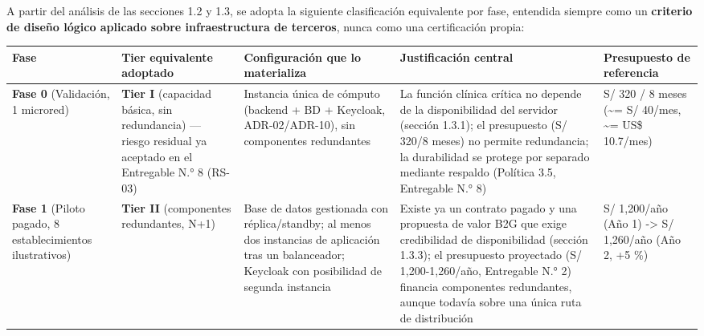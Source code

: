 \documentclass[11pt,a4paper]{article}
\begin{document}
A partir del análisis de las secciones 1.2 y 1.3, se adopta la siguiente clasificación equivalente por fase, entendida siempre como un \textbf{criterio de diseño lógico aplicado sobre infraestructura de terceros}, nunca como una certificación propia:

{\small
\begin{longtable}[]{@{}
  >{\raggedright\arraybackslash}p{}
  >{\raggedright\arraybackslash}p{}
  >{\raggedright\arraybackslash}p{}
  >{\raggedright\arraybackslash}p{}
  >{\raggedright\arraybackslash}p{}@{}}
\toprule\noalign{}
\begin{minipage}[b]{\linewidth}\raggedright
Fase
\end{minipage} & \begin{minipage}[b]{\linewidth}\raggedright
Tier equivalente adoptado
\end{minipage} & \begin{minipage}[b]{\linewidth}\raggedright
Configuración que lo materializa
\end{minipage} & \begin{minipage}[b]{\linewidth}\raggedright
Justificación central
\end{minipage} & \begin{minipage}[b]{\linewidth}\raggedright
Presupuesto de referencia
\end{minipage} \\
\midrule\noalign{}
\endhead
\bottomrule\noalign{}
\endlastfoot
\textbf{Fase 0} (Validación, 1 microred) & \textbf{Tier I} (capacidad básica, sin redundancia) --- riesgo residual ya aceptado en el Entregable N.° 8 (RS-03) & Instancia única de cómputo (backend + BD + Keycloak, ADR-02/ADR-10), sin componentes redundantes & La función clínica crítica no depende de la disponibilidad del servidor (sección 1.3.1); el presupuesto (S/ 320/8 meses) no permite redundancia; la durabilidad se protege por separado mediante respaldo (Política 3.5, Entregable N.° 8) & S/ 320 / 8 meses (\textasciitilde= S/ 40/mes, \textasciitilde= US\$ 10.7/mes) \\
\textbf{Fase 1} (Piloto pagado, 8 establecimientos ilustrativos) & \textbf{Tier II} (componentes redundantes, N+1) & Base de datos gestionada con réplica/standby; al menos dos instancias de aplicación tras un balanceador; Keycloak con posibilidad de segunda instancia & Existe ya un contrato pagado y una propuesta de valor B2G que exige credibilidad de disponibilidad (sección 1.3.3); el presupuesto proyectado (S/ 1,200-1,260/año, Entregable N.° 2) financia componentes redundantes, aunque todavía sobre una única ruta de distribución & S/ 1,200/año (Año 1) -\textgreater{} S/ 1,260/año (Año 2, +5 \%) \\

\end{longtable}}
\end{document}
